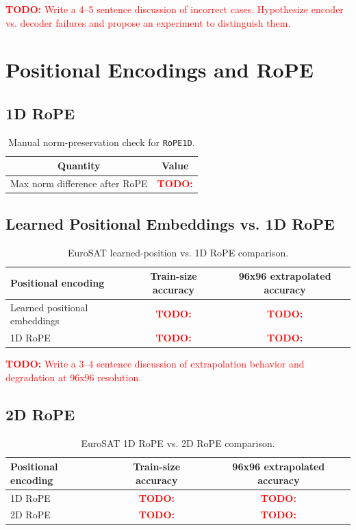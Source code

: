 \documentclass[11pt]{article}
\newcommand{\TODO}[1]{\textcolor{red}{\textbf{TODO:} #1}}
\newcommand{\class}[1]{\texttt{#1}}
\begin{document}
\TODO{Write a 4--5 sentence discussion of incorrect cases. Hypothesize encoder vs. decoder failures and propose an experiment to distinguish them.}

\section{Positional Encodings and RoPE}

\subsection{1D RoPE}

\begin{table}[H]
    \centering
    \begin{tabular}{cc}
        \toprule
        Quantity & Value \\
        \midrule
        Max norm difference after RoPE & \TODO{} \\
        \bottomrule
    \end{tabular}
    \caption{Manual norm-preservation check for \class{RoPE1D}.}
    \label{tab:rope-norm}
\end{table}

\subsection{Learned Positional Embeddings vs. 1D RoPE}

\begin{table}[H]
    \centering
    \begin{tabular}{lcc}
        \toprule
        Positional encoding & Train-size accuracy & 96x96 extrapolated accuracy \\
        \midrule
        Learned positional embeddings & \TODO{} & \TODO{} \\
        1D RoPE & \TODO{} & \TODO{} \\
        \bottomrule
    \end{tabular}
    \caption{EuroSAT learned-position vs. 1D RoPE comparison.}
    \label{tab:rope-1d}
\end{table}

\TODO{Write a 3--4 sentence discussion of extrapolation behavior and degradation at 96x96 resolution.}

\subsection{2D RoPE}

\begin{table}[H]
    \centering
    \begin{tabular}{lcc}
        \toprule
        Positional encoding & Train-size accuracy & 96x96 extrapolated accuracy \\
        \midrule
        1D RoPE & \TODO{} & \TODO{} \\
        2D RoPE & \TODO{} & \TODO{} \\
        \bottomrule
    \end{tabular}
    \caption{EuroSAT 1D RoPE vs. 2D RoPE comparison.}
    \label{tab:rope-2d}
\end{table}
\end{document}
